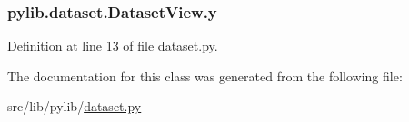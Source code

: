 \subsubsection[{\texorpdfstring{y}{y}}]{\setlength{\rightskip}{0pt plus 5cm}pylib.\+dataset.\+Dataset\+View.\+y}\hypertarget{classpylib_1_1dataset_1_1DatasetView_a708943fe44d29f54ad72bc30490f2c13}{}\label{classpylib_1_1dataset_1_1DatasetView_a708943fe44d29f54ad72bc30490f2c13}


Definition at line 13 of file dataset.\+py.



The documentation for this class was generated from the following file\+:\begin{DoxyCompactItemize}
\item 
src/lib/pylib/\hyperlink{dataset_8py}{dataset.\+py}\end{DoxyCompactItemize}
